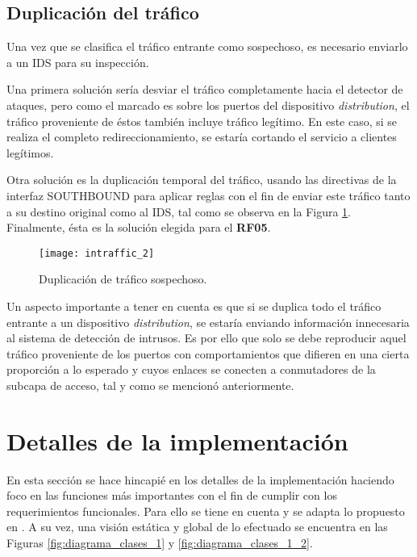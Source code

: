 \subsection{Duplicación del tráfico}

Una vez que se clasifica el tráfico entrante como sospechoso, es necesario
enviarlo a un IDS para su inspección.

Una primera solución sería desviar el tráfico completamente hacia el detector de
ataques, pero como el marcado es sobre los puertos del dispositivo
\textit{distribution}, el tráfico proveniente de éstos también incluye tráfico
legítimo. En este caso, si se realiza el completo redireccionamiento, se estaría
cortando el servicio a clientes legítimos.

Otra solución es la duplicación temporal del tráfico, usando las directivas de
la interfaz SOUTHBOUND para aplicar reglas con el fin de enviar este tráfico
tanto a su destino original como al IDS, tal como se observa en la Figura
\ref{fig:dupl_trafico}. Finalmente, ésta es la solución elegida para el
\textbf{RF05}.

\begin{figure}[H]
	\centering 
	\texttt{[image: intraffic\_2]}
	\caption{Duplicación de tráfico sospechoso.}
	\label{fig:dupl_trafico}
\end{figure}

Un aspecto importante a tener en cuenta es que si se duplica todo el tráfico
entrante a un dispositivo \textit{distribution}, se estaría enviando información
innecesaria al sistema de detección de intrusos. Es por ello que solo se debe
reproducir aquel tráfico proveniente de los puertos con comportamientos que
difieren en una cierta proporción a lo esperado y cuyos enlaces se conecten a
conmutadores de la subcapa de acceso, tal y como se mencionó anteriormente.

\section {Detalles de la implementación}

En esta sección se hace hincapié en los detalles de la implementación haciendo
foco en las funciones más importantes con el fin de cumplir con los
requerimientos funcionales. Para ello se tiene en cuenta y se adapta lo
propuesto en \parencite{estado_arte_2}. A su vez, una visión estática y global
de lo efectuado se encuentra en las Figuras \ref{fig:diagrama_clases_1} y
\ref{fig:diagrama_clases_1_2}.


